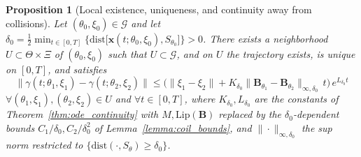 \documentclass{article}
\newtheorem{prop}{Proposition}
\begin{document}
	\begin{prop}[Local existence, uniqueness, and continuity away from collisions] \label{prop:local_cont2}
		Let $(\theta_0, \xi_0) \in \mathcal{G}$ and let $\delta_0 = \displaystyle\frac{1}{2}\min_{t \in [0,T]} \{ \mathrm{dist}\big[\mathbf{x}(t;\theta_0,\xi_0), S_{\theta_0}\big] \} > 0$. There exists a neighborhood $U \subset \Theta \times \Xi$ of $(\theta_0,\xi_0)$ such that $U \subset \mathcal{G}$, and on $U$ the trajectory exists, is unique on $[0,T]$, and satisfies
		\begin{equation}
			\|\gamma(t;\theta_1,\xi_1) - \gamma(t;\theta_2,\xi_2)\| \le \big(\|\xi_1-\xi_2\| + K_{\delta_0}\|\mathbf{B}_{\theta_1}-\mathbf{B}_{\theta_2}\|_{\infty,\delta_0}\, t\big)\, e^{L_{\delta_0} t}
		\end{equation}
		$\forall (\theta_1,\xi_1), (\theta_2,\xi_2) \in U$ and $\forall t \in [0,T]$, where $K_{\delta_0}, L_{\delta_0}$ are the constants of Theorem~\ref{thm:ode_continuity} with $M, \mathrm{Lip}(\mathbf{B})$ replaced by the $\delta_0$-dependent bounds $C_1/\delta_0, C_2/\delta_0^2$ of Lemma~\ref{lemma:coil_bounds}, and $\|\cdot\|_{\infty,\delta_0}$ the sup norm restricted to $\{\mathrm{dist}(\cdot,S_\theta) \ge \delta_0\}$.
	\end{prop}
\end{document}
